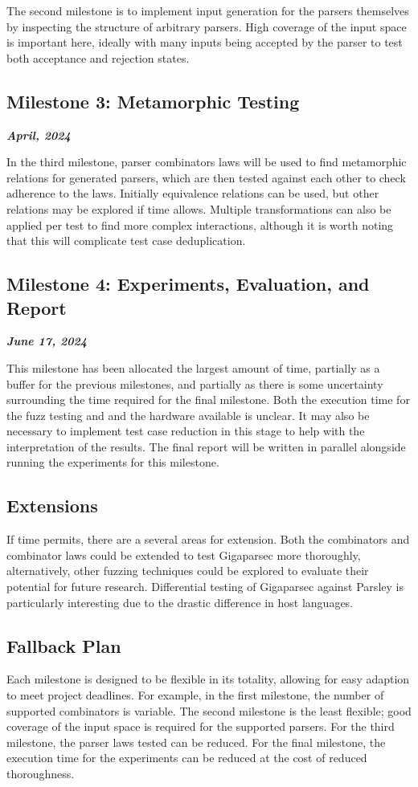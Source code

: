 \documentclass[11pt]{article}
\newcommand{\be}[1]{\textbf{\emph{#1}}}
\begin{document}
The second milestone is to implement input generation for the parsers themselves by inspecting the structure of arbitrary parsers. High coverage of the input space is important here, ideally with many inputs being accepted by the parser to test both acceptance and rejection states.

\subsection{Milestone 3: Metamorphic Testing}
\be{April, 2024}

In the third milestone, parser combinators laws will be used to find metamorphic relations for generated parsers, which are then tested against each other to check adherence to the laws. Initially equivalence relations can be used, but other relations may be explored if time allows. Multiple transformations can also be applied per test to find more complex interactions, although it is worth noting that this will complicate test case deduplication.

\subsection{Milestone 4: Experiments, Evaluation, and Report}
\be{June 17, 2024}

This milestone has been allocated the largest amount of time, partially as a buffer for the previous milestones, and partially as there is some uncertainty surrounding the time required for the final milestone. Both the execution time for the fuzz testing and and the hardware available is unclear. It may also be necessary to implement test case reduction in this stage to help with the interpretation of the results. The final report will be written in parallel alongside running the experiments for this milestone.

\subsection{Extensions}

If time permits, there are a several areas for extension. Both the combinators and combinator laws could be extended to test Gigaparsec more thoroughly, alternatively, other fuzzing techniques could be explored to evaluate their potential for future research. Differential testing of Gigaparsec against Parsley is particularly interesting due to the drastic difference in host languages.

\subsection{Fallback Plan}
Each milestone is designed to be flexible in its totality, allowing for easy adaption to meet project deadlines. For example, in the first milestone, the number of supported combinators is variable. The second milestone is the least flexible; good coverage of the input space is required for the supported parsers. For the third milestone, the parser laws tested can be reduced. For the final milestone, the execution time for the experiments can be reduced at the cost of reduced thoroughness.

\raggedright

\end{document}
